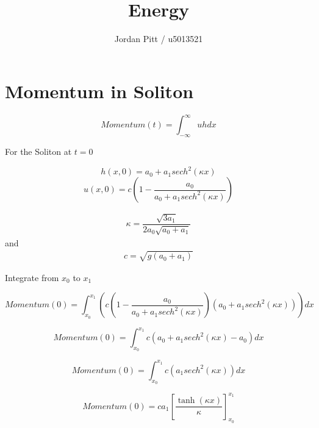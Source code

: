 \documentclass[12pt]{article}
\begin{document}
\title{Energy}
\author{Jordan Pitt / u5013521}

\section{Momentum in Soliton}

\[Momentum (t) = \int_{-\infty}^{\infty} uh dx \]

For the Soliton at $t = 0 $

\[h(x,0) = a_0 + a_1 sech^2\left(\kappa x\right)\]
\[u(x,0) = c\left(1 - \frac{a_0}{a_0 + a_1 sech^2\left(\kappa x\right)}\right)\]


\begin{gather}
\kappa = \dfrac{\sqrt{3a_1}}{2a_0 \sqrt{ a_0 + a_1}}
\end{gather}
and
\begin{gather}
c = \sqrt{g \left(a_0 + a_1\right)}
\end{gather}

Integrate from $x_0$ to $x_1$

\[Momentum (0) = \int_{x_0}^{x_1}  \left(c\left(1 - \frac{a_0}{a_0 + a_1 sech^2\left(\kappa x\right)}\right) \left(a_0 + a_1 sech^2\left(\kappa x\right)\right) \right) dx \]

\[Momentum (0) = \int_{x_0}^{x_1}  c\left(a_0 + a_1 sech^2\left(\kappa x\right) - a_0\right)  dx \]

\[Momentum (0) = \int_{x_0}^{x_1}  c\left(a_1 sech^2\left(\kappa x\right)\right)  dx \]

\[Momentum (0) = c a_1 \left[\frac{\tanh\left(\kappa x\right)}{\kappa}\right]_{x_0}^{x_1}\]
\end{document}
